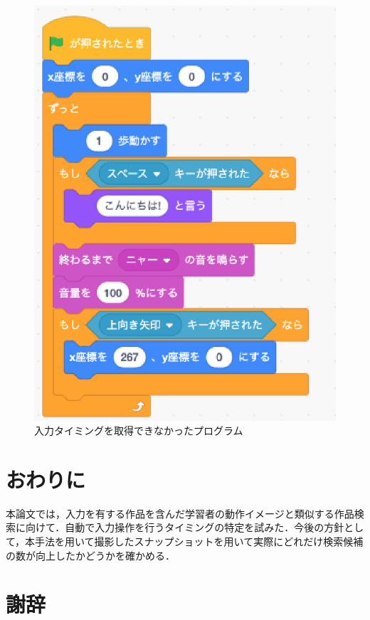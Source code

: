 \documentclass[uplatex,dvipdfmx,a4paper,twocolumn,base=11pt,jbase=11pt,ja=standard]{bxjsarticle}  %
\begin{document}
\begin{figure}
    \begin{center}
        \includegraphics[width=0.6\linewidth]{program.eps}
        \caption{入力タイミングを取得できなかったプログラム}
        \label{fig:test}
    \end{center}
\vspace{-13mm}
\end{figure}

%


\section{おわりに}

本論文では，入力を有する作品を含んだ学習者の動作イメージと類似する作品検索に向けて．自動で入力操作を行うタイミングの特定を試みた．今後の方針として，本手法を用いて撮影したスナップショットを用いて実際にどれだけ検索候補の数が向上したかどうかを確かめる．

\section*{謝辞}
\end{document}
